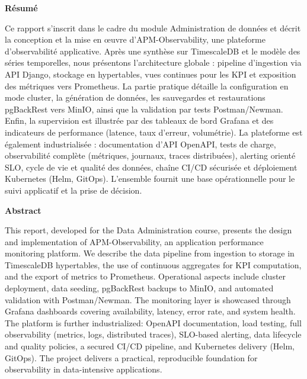 \documentclass[12pt,a4paper]{apm_report}
\begin{document}
\maketitle

\begin{center}
{\Large\bfseries Résumé}
\end{center}
Ce rapport s’inscrit dans le cadre du module Administration de données et décrit la conception et la mise en œuvre d’APM-Observability, une plateforme d’observabilité applicative. Après une synthèse sur TimescaleDB et le modèle des séries temporelles, nous présentons l’architecture globale : pipeline d’ingestion via API Django, stockage en hypertables, vues continues pour les KPI et exposition des métriques vers Prometheus. La partie pratique détaille la configuration en mode cluster, la génération de données, les sauvegardes et restaurations pgBackRest vers MinIO, ainsi que la validation par tests Postman/Newman. Enfin, la supervision est illustrée par des tableaux de bord Grafana et des indicateurs de performance (latence, taux d’erreur, volumétrie). La plateforme est également industrialisée : documentation d’API OpenAPI, tests de charge, observabilité complète (métriques, journaux, traces distribuées), alerting orienté SLO, cycle de vie et qualité des données, chaîne CI/CD sécurisée et déploiement Kubernetes (Helm, GitOps). L’ensemble fournit une base opérationnelle pour le suivi applicatif et la prise de décision.

\begin{center}
{\Large\bfseries Abstract}
\end{center}
This report, developed for the Data Administration course, presents the design and implementation of APM-Observability, an application performance monitoring platform. We describe the data pipeline from ingestion to storage in TimescaleDB hypertables, the use of continuous aggregates for KPI computation, and the export of metrics to Prometheus. Operational aspects include cluster deployment, data seeding, pgBackRest backups to MinIO, and automated validation with Postman/Newman. The monitoring layer is showcased through Grafana dashboards covering availability, latency, error rate, and system health. The platform is further industrialized: OpenAPI documentation, load testing, full observability (metrics, logs, distributed traces), SLO-based alerting, data lifecycle and quality policies, a secured CI/CD pipeline, and Kubernetes delivery (Helm, GitOps). The project delivers a practical, reproducible foundation for observability in data-intensive applications.

\clearpage
\tableofcontents
\clearpage
\listoffigures
\clearpage


\clearpage

\clearpage

\clearpage

\clearpage

\clearpage

\clearpage

\clearpage
\appendix


\clearpage


\end{document}
